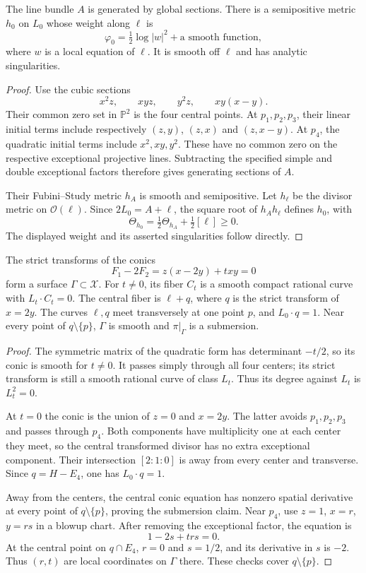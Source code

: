 \begin{lemma}\label{lem:four-point-central-semipositive-metric}
The line bundle $A$ is generated by global sections. There is a semipositive metric $h_0$ on $L_0$ whose weight along $\ell$ is
\[
 \varphi_0=\tfrac12\log|w|^2+\text{a smooth function},
\]
where $w$ is a local equation of $\ell$. It is smooth off $\ell$ and has analytic singularities.
\end{lemma}
\begin{proof}
Use the cubic sections
\[
 x^2z,\qquad xyz,\qquad y^2z,\qquad xy(x-y).
\]
Their common zero set in $\mathbb P^2$ is the four central points. At $p_1,p_2,p_3$, their linear initial terms include respectively $(z,y)$, $(z,x)$ and $(z,x-y)$. At $p_4$, the quadratic initial terms include $x^2,xy,y^2$. These have no common zero on the respective exceptional projective lines. Subtracting the specified simple and double exceptional factors therefore gives generating sections of $A$.

Their Fubini--Study metric $h_A$ is smooth and semipositive. Let $h_\ell$ be the divisor metric on $\mathcal O(\ell)$. Since $2L_0=A+\ell$, the square root of $h_Ah_\ell$ defines $h_0$, with
\[
 \Theta_{h_0}=\tfrac12\Theta_{h_A}+\tfrac12[\ell]\geq0.
\]
The displayed weight and its asserted singularities follow directly.
\end{proof}

\begin{lemma}\label{lem:four-point-conic-degeneration}
The strict transforms of the conics
\[
 F_1-2F_2=z(x-2y)+txy=0
\]
form a surface $\Gamma\subset\mathcal X$. For $t\ne0$, its fiber $C_t$ is a smooth compact rational curve with $L_t\cdot C_t=0$. The central fiber is $\ell+q$, where $q$ is the strict transform of $x=2y$. The curves $\ell,q$ meet transversely at one point $p$, and $L_0\cdot q=1$. Near every point of $q\setminus\{p\}$, $\Gamma$ is smooth and $\pi|_\Gamma$ is a submersion.
\end{lemma}
\begin{proof}
The symmetric matrix of the quadratic form has determinant $-t/2$, so its conic is smooth for $t\ne0$. It passes simply through all four centers; its strict transform is still a smooth rational curve of class $L_t$. Thus its degree against $L_t$ is $L_t^2=0$.

At $t=0$ the conic is the union of $z=0$ and $x=2y$. The latter avoids $p_1,p_2,p_3$ and passes through $p_4$. Both components have multiplicity one at each center they meet, so the central transformed divisor has no extra exceptional component. Their intersection $[2:1:0]$ is away from every center and transverse. Since $q=H-E_4$, one has $L_0\cdot q=1$.

Away from the centers, the central conic equation has nonzero spatial derivative at every point of $q\setminus\{p\}$, proving the submersion claim. Near $p_4$, use $z=1$, $x=r$, $y=rs$ in a blowup chart. After removing the exceptional factor, the equation is
\[
 1-2s+trs=0.
\]
At the central point on $q\cap E_4$, $r=0$ and $s=1/2$, and its derivative in $s$ is $-2$. Thus $(r,t)$ are local coordinates on $\Gamma$ there. These checks cover $q\setminus\{p\}$.
\end{proof}

